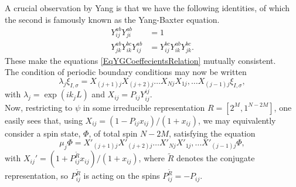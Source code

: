 A crucial observation by Yang is that we have the following identities, of which the second is famously known as the Yang-Baxter equation. \begin{equation}
\begin{aligned}
Y_{ij}^{ab}Y_{ji}^{ab}&=1\\
Y_{jk}^{ab}Y_{ik}^{bc}Y_{ij}^{ab}&=Y_{ij}^{bc}Y_{ik}^{ab}Y_{jk}^{bc}.
\end{aligned}
\end{equation}
These make the equations \eqref{EqYGCoeffecientsRelation} mutually consistent.\\
The condition of periodic boundary conditions may now be written \begin{equation}\label{EqYGPeriodicBoundaryCondition}
\lambda_j\xi_{I,\sigma}=X_{(j+1)j}X_{(j+2)j}\ldots X_{Nj}X_{1j},\ldots X_{(j-1)j}\xi_{I,\sigma},
\end{equation}
with $ \lambda_j=\exp(ik_j L) $ and $ X_{ij}=P_{ij}Y_{ij}^{ij} $.\\
Now, restricting to $ \psi $ in some irreducible representation $ R=[2^{M},1^{N-2M}] $, one easily sees that, using $ X_{ij}=(1-P_{ij}x_{ij})/(1+x_{ij}) $,  we may equivalently consider a spin state, $ \Phi $, of total spin $ N-2M $, satisfying the equation \begin{equation}
\mu_j\Phi=X'_{(j+1)j}X'_{(j+2)j}\ldots X'_{Nj}X'_{1j},\ldots X'_{(j-1)j} \Phi,
\end{equation}
with $ X_{ij}'=(1+P^{\tilde{R}}_{ij}x_{ij})/(1+x_{ij}) $, where $ \tilde{R} $ denotes the conjugate representation, so $ P^{\tilde{R}}_{ij} $ is acting on the spins \ie $ P^{\tilde{R}}_{ij}=-P_{ij} $.\\
